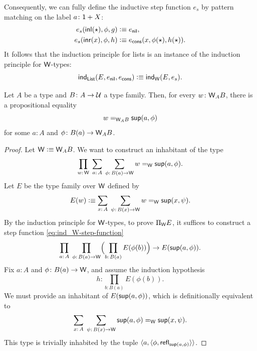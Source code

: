 \begin{xmpl}
    Consequently, we can fully define the inductive step function $e_s$ by pattern matching on the label $a\colon\fun1+X$:
    \begin{align*}
        e_s(\mathsf{inl}({\mathsf{\star}}),\phi,g)
            &\mathrel{\vcentcolon}\equiv e_{\mathsf{nil}},\\
        e_s(\mathsf{inr}(x),\phi,h)
            &\mathrel{\vcentcolon}\equiv e_{\mathsf{cons}}
                (x,\phi({\mathsf{\star}}),h({\mathsf{\star}})).
    \end{align*}
    It follows that the induction principle for lists is an instance of the induction principle for $\mathsf{W}$-types:
    \[
        \mathsf{ind}_{\mathsf{List}}(
            E,e_{\mathsf{nil}},e_{\mathsf{cons}}
            )
           \mathrel{\vcentcolon}\equiv\mathsf{ind}_{\mathsf{W}}(E,e_s).
    \]
\end{xmpl}

\begin{thm}\label{thm:W-type-element-construction}
    Let $A$ be a type and $B\colon A\to\univ$ a type family. Then, for every $w\colon\fun W_AB$, there is a propositional equality
    \[
        w\mathrel{=_{\mathsf{W}_AB}}\mathsf{sup}(a,\phi)
    \]
    for some $a\colon A$ and $\phi\colon B(a)\to\fun W_AB$.
\end{thm}

\begin{proof}
    Let $\mathsf{W}\mathrel{\vcentcolon}\equiv\mathsf{W}_AB$. We want to construct an inhabitant of the type
    \[
        \prod_{w\colon\fun W}\;
        \sum_{a\colon A}\;
        \sum_{\phi\colon B(a)\to\fun W}
            w\eq{\fun W}\fun{sup}(a,\phi).
    \]
    Let $E$ be the type family over $\mathsf{W}$ defined by
    \[
        E(w)\defeq\sum_{x\colon A}\;
            \sum_{\psi\colon B(x)\to\fun W}
                w\eq{\fun W}\fun{sup}(x,\psi).
    \]
    By the induction principle for $\mathsf{W}$-types, to prove $\Pi_{\mathsf{W}}E$, it suffices to construct a step function \eqref{eq:ind_W-step-function}
    \[
        \prod_{a\colon A}\;
        \prod_{\phi\colon B(a)\to\fun W}
        \Bigl(\prod_{b\colon B(a)} E(\phi(b))\Bigr)
            \to E(\fun{sup}(a,\phi)).
    \]
    Fix $a\colon A$ and $\phi\colon B(a)\to\fun W$, and assume the induction hypothesis
    \[
        h\colon\prod_{b\colon B(a)}E(\phi(b)).
    \]
    We must provide an inhabitant of $E(\mathsf{sup}(a,\phi))$, which is definitionally equivalent to
    \[
        \sum_{x\colon A}\;
        \sum_{\psi\colon B(x)\to\fun W}
        \fun{sup}(a,\phi)\eq{\fun W}\fun{sup}(x,\psi).
    \]
    This type is trivially inhabited by the tuple $\langle a,\langle\phi,\mathsf{refl}_{\mathsf{sup}(a,\phi)}\rangle\rangle$.
    
\end{proof}


